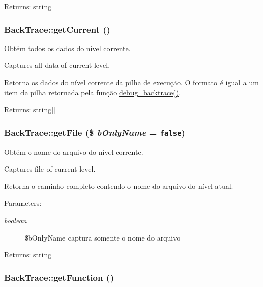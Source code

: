 \begin{Desc}
\item[Returns:]string \end{Desc}
\hypertarget{class_back_trace_bf0335130b2625274c8bcfe2449d018e}{
\subsubsection[{getCurrent}]{\setlength{\rightskip}{0pt plus 5cm}BackTrace::getCurrent ()}}
\label{class_back_trace_bf0335130b2625274c8bcfe2449d018e}


Obtém todos os dados do nível corrente.

Captures all data of current level.

Retorna os dados do nível corrente da pilha de execução. O formato é igual a um item da pilha retornada pela função \hyperlink{}{debug\_\-backtrace()}.

\begin{Desc}
\item[Returns:]string\mbox{[}\mbox{]} \end{Desc}
\hypertarget{class_back_trace_d8010953ac26a66f21347a850895110d}{
\subsubsection[{getFile}]{\setlength{\rightskip}{0pt plus 5cm}BackTrace::getFile (\$ {\em bOnlyName} = {\tt false})}}
\label{class_back_trace_d8010953ac26a66f21347a850895110d}


Obtém o nome do arquivo do nível corrente.

Captures file of current level.

Retorna o caminho completo contendo o nome do arquivo do nível atual.

\begin{Desc}
\item[Parameters:]
\begin{description}
\item[{\em boolean}]\$bOnlyName captura somente o nome do arquivo \end{description}
\end{Desc}
\begin{Desc}
\item[Returns:]string \end{Desc}
\hypertarget{class_back_trace_03b4a4f0f94cf004b754e991db26cec7}{
\subsubsection[{getFunction}]{\setlength{\rightskip}{0pt plus 5cm}BackTrace::getFunction ()}}
\label{class_back_trace_03b4a4f0f94cf004b754e991db26cec7}


